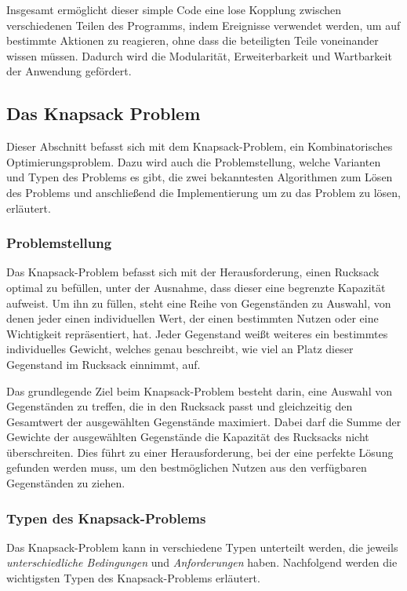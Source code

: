 Insgesamt ermöglicht dieser simple Code eine lose Kopplung zwischen verschiedenen Teilen des Programms, indem Ereignisse verwendet
werden, um auf bestimmte Aktionen zu reagieren, ohne dass die beteiligten Teile voneinander wissen müssen. Dadurch wird die
Modularität, Erweiterbarkeit und Wartbarkeit der Anwendung gefördert.

\subsection{\label{sec:MoritzInventarBerechnen}Das Knapsack Problem} 
Dieser Abschnitt befasst sich mit dem Knapsack-Problem, ein Kombinatorisches Optimierungsproblem. Dazu wird auch die
Problemstellung, welche Varianten und Typen des Problems es gibt, die zwei bekanntesten Algorithmen zum Lösen des Problems
und anschließend die Implementierung um zu das Problem zu lösen, erläutert.

\subsubsection{Problemstellung}
Das Knapsack-Problem befasst sich mit der Herausforderung, einen Rucksack optimal zu befüllen, unter der Ausnahme, dass
dieser eine begrenzte Kapazität aufweist. Um ihn zu füllen, steht eine Reihe von Gegenständen zu Auswahl, von denen jeder
einen individuellen Wert, der einen bestimmten Nutzen oder eine Wichtigkeit repräsentiert, hat. Jeder Gegenstand weißt
weiteres ein bestimmtes individuelles Gewicht, welches genau beschreibt, wie viel an Platz dieser Gegenstand im Rucksack
einnimmt, auf.

Das grundlegende Ziel beim Knapsack-Problem besteht darin, eine Auswahl von Gegenständen zu treffen, die in den Rucksack
passt und gleichzeitig den Gesamtwert der ausgewählten Gegenstände maximiert. Dabei darf die Summe der Gewichte der
ausgewählten Gegenstände die Kapazität des Rucksacks nicht überschreiten. Dies führt zu einer Herausforderung, bei der
eine perfekte Lösung gefunden werden muss, um den bestmöglichen Nutzen aus den verfügbaren Gegenständen zu ziehen.

\subsubsection{Typen des Knapsack-Problems}\label{sec:knapsackTypen}
Das Knapsack-Problem kann in verschiedene Typen unterteilt werden, die jeweils \textit{unterschiedliche Bedingungen}
und \textit{Anforderungen} haben. Nachfolgend werden die wichtigsten Typen des Knapsack-Problems erläutert.

